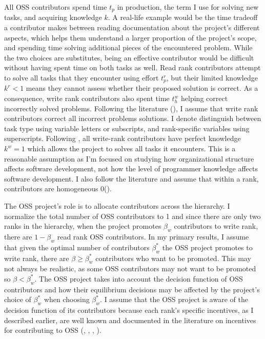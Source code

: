 \documentclass[source/paper/main.tex]{subfiles}
\begin{document}
\qquad  All OSS contributors spend time $t_p$ in production, the term I use for solving new tasks, and acquiring knowledge $k$. A real-life example would be the time tradeoff a contributor makes between reading documentation about the project's different aspects, which helps them understand a larger proportion of the project's scope, and spending time solving additional pieces of the encountered problem. While the two choices are substitutes, being an effective contributor would be difficult without having spent time on both tasks as well. Read rank contributors attempt to solve all tasks that they encounter using effort $t_p^r$, but their limited knowledge $k^r < 1$ means they cannot assess whether their proposed solution is correct. As a consequence, write rank contributors also spent time $t_h^w$ helping correct incorrectly solved problems. Following the literature (\cite{garicano_hierarchies_2000}), I assume that write rank contributors correct all incorrect problems solutions. I denote distinguish between task type using variable letters or subscripts, and rank-specific variables using superscripts. Following \cite{bloom_distinct_2014}, all write-rank contributors have perfect knowledge $k^w = 1$ which allows the project to solves all tasks it encounters. This is a reasonable assumption as I'm focused on studying how organizational structure affects software development, not how the level of programmer knowledge affects software development. I also follow the literature and assume that within a rank, contributors are homogeneous 0(\cite{garicano_hierarchies_2000}). 

\qquad The OSS project's role is to allocate contributors across the hierarchy. I normalize the total number of OSS contributors to 1 and since there are only two ranks in the hierarchy, when the project promotes $\beta_w$ contributors to write rank, there are $1 - \beta_w$ read rank OSS contributors. In my primary results, I assume that given the optimal number of contributors $\beta_w^*$ the OSS project promotes to write rank, there are $\beta \geq \beta_w^*$  contributors who want to be promoted. This may not always be realistic, as some OSS contributors may not want to be promoted so $\beta < \beta_w^*$. The OSS project takes into account the decision function of OSS contributors and how their equilibrium decisions may be affected by the project's choice of $\beta_w^*$ when choosing $\beta_w^*$. I assume that the OSS project is aware of the decision function of its contributors because each rank's specific incentives, as I described earlier, are well known and documented in the literature on incentives for contributing to OSS (\cite{lerner_simple_2002}, \cite{lakhani_how_2003}, \cite{von_krogh_community_2003}, \cite{robert_g_wolf_why_2003}). 
\end{document}
